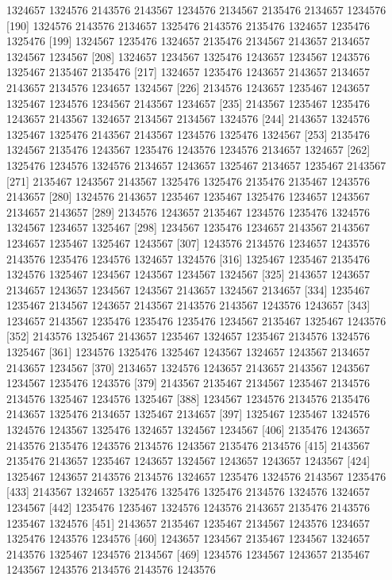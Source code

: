 \documentclass{scrartcl}
\begin{document}
\begin{Schunk}
\begin{Soutput}
 [181] 1324657 1324576 2143576 2143567 1234576 2134567 2135476 2134657 1234576
 [190] 1324576 2143576 2134657 1325476 2143576 2135476 1324657 1235476 1325476
 [199] 1324567 1235476 1324657 2135476 2134567 2143657 2134657 1324567 1234567
 [208] 1324657 1234567 1325476 1243657 1234567 1243576 1325467 2135467 2135476
 [217] 1324657 1235476 1243657 2143657 2134657 2143657 2134576 1234657 1324567
 [226] 2134576 1243657 1235467 1243657 1325467 1234576 1234567 2143567 1234657
 [235] 2143567 1235467 1235476 1243657 2143567 1324657 2134567 2134567 1324576
 [244] 2143657 1324576 1325467 1325476 2143567 2143567 1234576 1325476 1324567
 [253] 2135476 1324567 2135476 1243567 1235476 1243576 1234576 2134657 1324657
 [262] 1325476 1234576 1324576 2134657 1243657 1325467 2134657 1235467 2143567
 [271] 2135467 1243567 2143567 1325476 1325476 2135476 2135467 1243576 2143657
 [280] 1324576 2143657 1235467 1235467 1325476 1234657 1243567 2134657 2143657
 [289] 2134576 1243657 2135467 1234576 1235476 1324576 1324567 1234657 1325467
 [298] 1234567 1235476 1234657 2143567 2143567 1234657 1235467 1325467 1243567
 [307] 1243576 2134576 1234657 1243576 2143576 1235476 1234576 1324657 1324576
 [316] 1325467 1235467 2135476 1324576 1325467 1234567 1243567 1234567 1324567
 [325] 2143657 1243657 2134657 1243657 1234567 1243567 2143657 1324567 2134657
 [334] 1235467 1235467 2134567 1243657 2143567 2143576 2143567 1243576 1243657
 [343] 1234657 2143567 1235476 1235476 1235476 1234567 2135467 1325467 1243576
 [352] 2143576 1325467 2143657 1235467 1324657 1235467 2134576 1324576 1325467
 [361] 1234576 1325476 1325467 1243567 1324657 1243567 2134657 2143657 1234567
 [370] 2134657 1324576 1243657 2143657 2143567 1243567 1234567 1235476 1243576
 [379] 2143567 2135467 2134567 1235467 2134576 2134576 1325467 1234576 1325467
 [388] 1234567 1234576 2134576 2135476 2143657 1325476 2134657 1325467 2134657
 [397] 1325467 1235467 1324576 1324576 1243567 1325476 1324657 1324567 1234567
 [406] 2135476 1243657 2143576 2135476 1243576 2134576 1243567 2135476 2134576
 [415] 2143567 2135476 2143657 1235467 1243657 1324567 1243657 1243657 1243567
 [424] 1325467 1243657 2143576 2134576 1324657 1235476 1324576 2143567 1235476
 [433] 2143567 1324657 1325476 1325476 1325476 2134576 1324576 1324657 1234567
 [442] 1235476 1235467 1324576 1243576 2143657 2135476 2143576 1235467 1324576
 [451] 2143657 2135467 1235467 2134567 1243576 1234657 1325476 1243576 1234576
 [460] 1243657 1234567 2135467 1234567 1324657 2143576 1325467 1234576 2134567
 [469] 1234576 1234567 1243657 2135467 1243567 1243576 2134576 2143576 1243576

\end{Soutput}
\end{Schunk}
\end{document}
